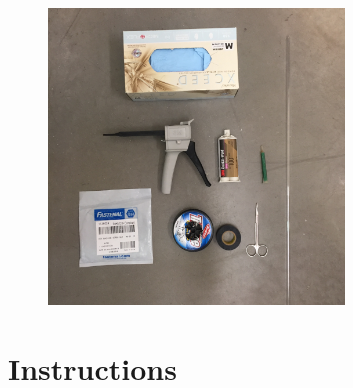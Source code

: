 \documentclass[letterpaper,12pt]{article}
\begin{document}
	\begin{figure}[ht]
		\centering
		\includegraphics[width=0.7\textwidth, angle=-90]{materials}
	\end{figure}
	
\newpage
	
\section{Instructions}
\end{document}
